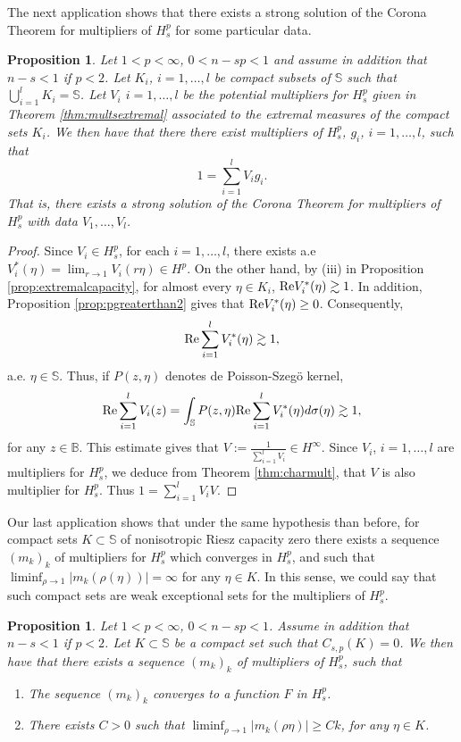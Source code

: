 \documentclass[12pt,twoside,leqno,final]{amsart}
\theoremstyle{plain}
\newtheorem{prop}[thm]{Proposition}
\begin{document}
The next application shows that there exists a strong solution of the Corona Theorem for multipliers of $H_s^p$ for some particular data.
\begin{prop}\label{prop:corona}
Let $1<p<\infty$, $0<n-sp<1$ and assume in addition that $n-s<1$ if $p< 2$.  Let $K_i$, $i=1,\dots,l$ be compact subsets of ${{\mathbb S}}$ such that $\bigcup_{i=1}^l K_i={{\mathbb S}}$.  Let $V_i$ $i=1,\dots,l$ be the potential multipliers for $H_s^p$ given in Theorem \ref{thm:multsextremal} associated to the extremal measures of the compact sets $K_i$.  We then have that
there there exist multipliers of $H_s^p$, $g_i$, $i=1,\dots,l$,  such that
$$1=\sum_{i=1}^l V_i g_i.$$
That is, there exists a strong solution of the Corona Theorem for multipliers of $H_s^p$ with data $V_1,\dots, V_l$.
\end{prop}
\begin{proof}
Since $V_i\in H_s^p$, for each $i=1,\dots,l$, there exists a.e $V_i^*(\eta)=\lim_{r\rightarrow 1} V_i(r\eta)\in H^p$. On the other hand, by (iii) in Proposition \ref{prop:extremalcapacity}, for almost every $\eta\in K_i$,   ${\rm Re}V_i^*(\eta)\gtrsim 1$. In addition,  Proposition \ref{prop:pgreaterthan2} gives that ${\rm Re}V_i^*(\eta)\geq 0$. Consequently,
$${\rm Re}\sum_{i=1}^lV_i^*(\eta)\gtrsim 1,$$
a.e. $\eta\in{{\mathbb S}}$.
Thus, if $P(z,\eta)$ denotes de Poisson-Szeg\"o kernel,
$${\rm Re}\sum_{i=1}^lV_i
(z)=\int_{{\mathbb S}} P(z,\eta){\rm Re}\sum_{i=1}^lV_i^*(\eta)d\sigma(\eta) \gtrsim 1,$$
for any $z\in {{\mathbb B}}$.
This estimate gives that
$V:=\frac1{\sum_{i=1}^lV_i}\in H^\infty$. Since $V_i$, $i=1,\dots, l$ are multipliers for $H_s^p$, we deduce from Theorem \ref{thm:charmult}, that
$V$ is also multiplier for $H_s^p$. Thus $1=\sum_{i=1}^l V_i V$.

\end{proof}
Our last application shows that under the same hypothesis than before, for  compact sets $K\subset {{\mathbb S}}$ of nonisotropic Riesz capacity zero there exists a sequence $(m_k)_k$ of multipliers for $H_s^p$ which converges in $H_s^p$, and such that $\liminf_{\rho\rightarrow 1} |m_k(\rho(\eta))|=\infty$ for any $\eta\in K$. In this sense, we could say that such compact sets are weak exceptional sets for the multipliers of $H_s^p$.
\begin{prop}\label{prop:compact}
Let $1<p<\infty$, $0<n-sp<1$. Assume in addition that $n-s<1$ if $p< 2$. Let $K\subset {{\mathbb S}}$ be a compact set such that $C_{s,p}(K)=0$. We then have that there exists a sequence $(m_k)_k$ of multipliers of $H_s^p$,   such  that 
\begin{enumerate}
\item The sequence $(m_k)_k$ converges to a function $F$ in $H_s^p$.
\item There exists $C>0$ such that $\liminf_{\rho\rightarrow1} |m_k(\rho\eta)|\geq C k$, for any $\eta\in K$.
\end{enumerate}

\end{prop}
\end{document}
